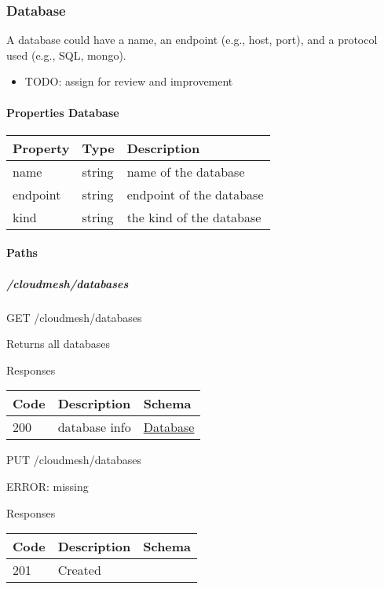 \documentclass[9pt,]{article}
\providecommand{\tightlist}{%
  \setlength{\itemsep}{0pt}\setlength{\parskip}{0pt}}
\let\oldparagraph\paragraph
\renewcommand{\paragraph}[1]{\oldparagraph{#1}\mbox{}}
\let\oldsubparagraph\subparagraph
\renewcommand{\subparagraph}[1]{\oldsubparagraph{#1}\mbox{}}
\begin{document}
\hypertarget{database}{%
\subsubsection{Database}\label{database}}

A database could have a name, an endpoint (e.g., host, port), and a
protocol used (e.g., SQL, mongo).

\begin{itemize}
\tightlist
\item
  TODO: assign for review and improvement
\end{itemize}

\hypertarget{properties-database}{%
\paragraph{Properties Database}\label{properties-database}}

\begin{longtable}[]{@{}lll@{}}
\toprule
Property & Type & Description\tabularnewline
\midrule
\endhead
name & string & name of the database\tabularnewline
endpoint & string & endpoint of the database\tabularnewline
kind & string & the kind of the database\tabularnewline
\bottomrule
\end{longtable}

\hypertarget{paths-7}{%
\paragraph{Paths}\label{paths-7}}

\hypertarget{cloudmeshdatabases}{%
\subparagraph{/cloudmesh/databases}\label{cloudmeshdatabases}}

GET /cloudmesh/databases

Returns all databases

Responses

\begin{longtable}[]{@{}lll@{}}
\toprule
Code & Description & Schema\tabularnewline
\midrule
\endhead
200 & database info &
\protect\hyperlink{database}{Database}\tabularnewline
\bottomrule
\end{longtable}

PUT /cloudmesh/databases

ERROR: missing

Responses

\begin{longtable}[]{@{}lll@{}}
\toprule
Code & Description & Schema\tabularnewline
\midrule
\endhead
201 & Created &\tabularnewline
\bottomrule
\end{longtable}
\end{document}

